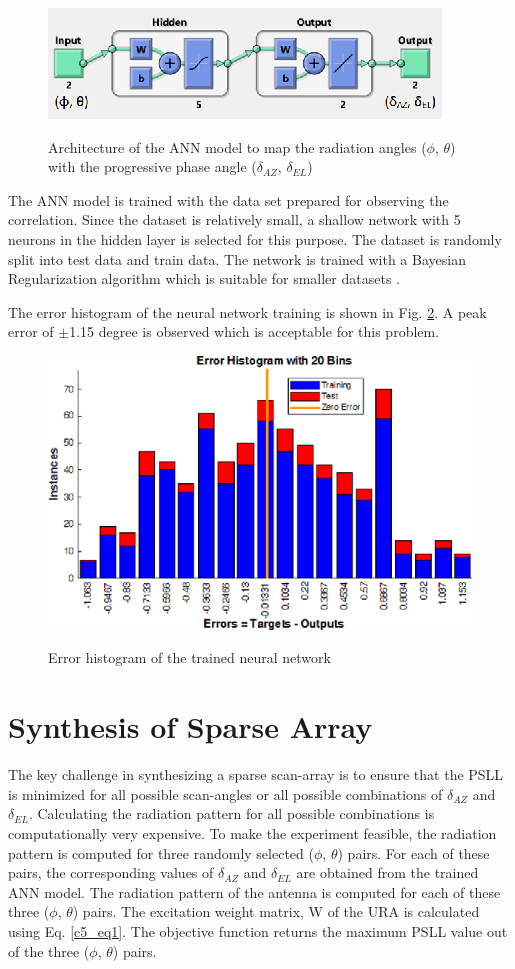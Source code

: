 \begin{figure}
  \centering
  \includegraphics[width=0.6\linewidth]{Fig-naun_4.eps}\\
  \caption{Architecture of the ANN model to map the radiation angles ($\phi$, $\theta$) with the progressive phase angle ($\delta_{AZ}$, $\delta_{EL}$)} \label{fig_5_4}
\end{figure}

The ANN model is trained with the data set prepared for observing the correlation. Since the dataset is relatively small, a shallow network with 5 neurons in the hidden layer is selected for this purpose. The dataset is randomly split into test data and train data. The network is trained with a Bayesian Regularization algorithm which is suitable for smaller datasets \cite{bayesian_regularization, kumaresh_surrgoate}.

The error histogram of the neural network training is shown in Fig. \ref{fig_5_5}. A peak error of $\pm$1.15 degree is observed which is acceptable for this problem.

\begin{figure}
  \centering
  \includegraphics[width=0.5\linewidth]{Fig-naun_5.eps}\\
  \caption{Error histogram of the trained neural network} \label{fig_5_5}
\end{figure}

\section{Synthesis of Sparse Array}\label{c5sec_synth}
The key challenge in synthesizing a sparse scan-array is to ensure that the PSLL is minimized for all possible scan-angles or all possible combinations of $\delta_{AZ}$ and $\delta_{EL}$. Calculating the radiation pattern for all possible combinations is computationally very expensive. To make the experiment feasible, the radiation pattern is computed for three randomly selected ($\phi$, $\theta$) pairs. For each of these pairs, the corresponding values of $\delta_{AZ}$ and $\delta_{EL}$ are obtained from the trained ANN model. The radiation pattern of the antenna is computed for each of these three ($\phi$, $\theta$) pairs. The excitation weight matrix, W of the URA is calculated using Eq. \ref{c5_eq1}. The objective function returns the maximum PSLL value out of the three ($\phi$, $\theta$) pairs.


